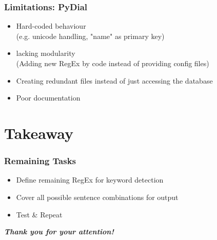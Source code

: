 \documentclass[11pt]{beamer}
\begin{document}
	\begin{frame}
		\frametitle{Limitations: PyDial}
		\begin{itemize}
			\item Hard-coded behaviour\\
			(e.g. unicode handling, "name" as primary key)\pause
			\item lacking modularity\\
			(Adding new RegEx by code instead of providing config files)\pause
			\item Creating redundant files instead of just accessing the database\pause
			\item Poor documentation
		\end{itemize}
	\end{frame}

\section{Takeaway}
\begin{frame}
	\frametitle{Remaining Tasks}
	\begin{itemize}
		\item Define remaining RegEx for keyword detection\pause
		\item Cover all possible sentence combinations for output\pause
		\item Test \& Repeat
	\end{itemize}
\end{frame}	

\begin{frame}
	\centering \Large
	\emph{\textbf{Thank you for your attention!}}
\end{frame}
\end{document}
